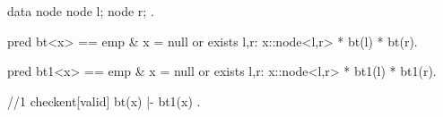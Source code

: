 data node {
  node l;
  node r;
}.

pred bt<x> == emp & x = null
  or exists l,r: x::node<l,r> * bt(l) * bt(r).

pred bt1<x> == emp & x = null
  or exists l,r: x::node<l,r> * bt1(l) * bt1(r).


//1
checkent[valid] bt(x) |- bt1(x) .
